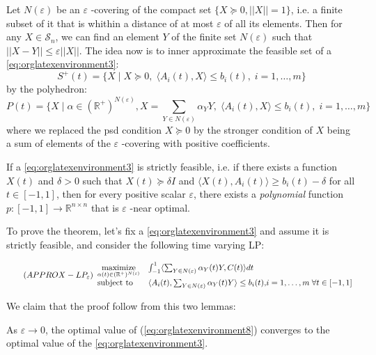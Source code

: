 \documentclass[moor]{informs1}
\begin{document}
Let \(N(\varepsilon)\) be an \(\varepsilon\) -covering of the compact set \(\{X \succeq 0, ||X|| = 1\}\), i.e. a finite subset of it that is whithin a distance of at most \(\varepsilon\) of all its elements. Then for any \(X \in \mathcal S_n\), we can find an element \(Y\) of the finite set \(N(\varepsilon)\) such that \(||X - Y|| \le \varepsilon ||X||\). The idea now is to inner approximate the feasible set of a \ref{eq:orglatexenvironment3}:
$$S^+(t) = \{ X \;| \; X \succeq  0, \; \langle A_i(t), X \rangle \le b_i(t), \; i=1,\ldots, m\}$$
by the polyhedron:
$$P(t) = \{ X \; | \; \alpha \in (\mathbb R^+)^{N(\varepsilon)},   X = \sum_{Y \in N(\varepsilon)} \alpha_Y Y, \; \langle A_i(t), X \rangle \le b_i(t), \; i = 1,\ldots, m\}$$
\noindent where we replaced the psd condition \(X \succeq 0\) by the stronger condition of \(X\) being a sum of elements of the \(\varepsilon\) -covering with positive coefficients.

\begin{thm}
If a \ref{eq:orglatexenvironment3} is strictly feasible, i.e. if there exists a function \(X(t)\) and \(\delta > 0\) such that \(X(t) \succeq \delta I\) and \(\langle X(t), A_i(t) \rangle  \ge b_i(t) - \delta\) for all \(t \in [-1, 1]\), then for every positive scalar \(\varepsilon\), there exists a \emph{polynomial} function \(p: [-1, 1] \rightarrow \mathbb R^{n \times n}\) that is \(\varepsilon\) -near optimal.
\label{orgspecialblock18}

\end{thm}


To prove the theorem, let's fix a \ref{eq:orglatexenvironment3} and assume it is strictly feasible, and consider the following time varying LP:

\begin{equation*}
\label{eq:orglatexenvironment8}
\tag{$APPROX-LP_{\varepsilon}$}
\begin{array}{ll@{}ll}
\underset{\alpha(t) \in (\mathbb R^+)^{N(\varepsilon)}}{\text{maximize}} & \int_{-1}^1 \langle \sum_{Y \in N(\varepsilon)} \alpha_Y(t) Y, C(t) \rangle dt & \\
\text{subject to}
& \langle A_i(t), \sum_{Y \in N(\varepsilon)} \alpha_Y(t) Y \rangle \le b_i(t), & i=1,\ldots,m \; \forall t \in [-1, 1]
\end{array}
\end{equation*}

We claim that the proof follow from this two lemmas:

\begin{lemma}
As \(\varepsilon \rightarrow 0\), the optimal value of (\ref{eq:orglatexenvironment8}) converges to the optimal value of the \ref{eq:orglatexenvironment3}. 
\label{orgspecialblock19}

\end{lemma}
\end{document}

